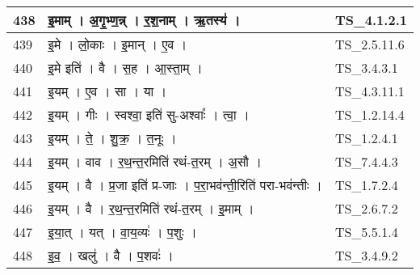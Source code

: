 \documentclass[17pt]{extarticle}
\begin{document}
\begin{longtable}{||p{0.4in}||p{4.9in}||p{0.9in}||}
    \hline
        
    438 & इ॒माम्   ।   अ॒गृ॒भ्ण॒न्न्   ।   र॒श॒नाम्   ।   ऋ॒तस्य॑   ।    & TS\_4.1.2.1       \\
    
    \hline
        
    439 & इ॒मे   ।   लो॒काः   ।   इ॒मान्   ।   ए॒व   ।    & TS\_2.5.11.6       \\
    
    \hline
        
    440 & इ॒मे इति॑   ।   वै   ।   स॒ह   ।   आ॒स्ता॒म्   ।    & TS\_3.4.3.1       \\
    
    \hline
        
    441 & इ॒यम्   ।   ए॒व   ।   सा   ।   या   ।    & TS\_4.3.11.1       \\
    
    \hline
        
    442 & इ॒यम्   ।   गीः   ।   स्वश्वा॒ इति॑ सु{-}अश्वाः᳚   ।   त्वा॒   ।    & TS\_1.2.14.4       \\
    
    \hline
        
    443 & इ॒यम्   ।   ते॒   ।   शु॒क्र॒   ।   त॒नूः   ।    & TS\_1.2.4.1       \\
    
    \hline
        
    444 & इ॒यम्   ।   वाव   ।   र॒थ॒न्त॒रमिति॑ रथं{-}त॒रम्   ।   अ॒सौ   ।    & TS\_7.4.4.3       \\
    
    \hline
        
    445 & इ॒यम्   ।   वै   ।   प्र॒जा इति॑ प्र{-}जाः   ।   प॒रा॒भव॑न्ती॒रिति॑ परा{-}भव॑न्तीः   ।    & TS\_1.7.2.4       \\
    
    \hline
        
    446 & इ॒यम्   ।   वै   ।   र॒थ॒न्त॒रमिति॑ रथं{-}त॒रम्   ।   इ॒माम्   ।    & TS\_2.6.7.2       \\
    
    \hline
        
    447 & इ॒या॒त्   ।   यत्   ।   वा॒य॒व्यः॑   ।   प॒शुः   ।    & TS\_5.5.1.4       \\
    
    \hline
        
    448 & इ॒व॒   ।   खलु॑   ।   वै   ।   प॒शवः॑   ।    & TS\_3.4.9.2       \\
    

\end{longtable}
\end{document}
